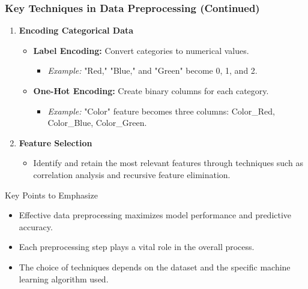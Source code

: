 \documentclass[aspectratio=169]{beamer}
\begin{document}
\begin{frame}[fragile]
    \frametitle{Key Techniques in Data Preprocessing (Continued)}
    \begin{enumerate}[resume]
        \item \textbf{Encoding Categorical Data}
            \begin{itemize}
                \item \textbf{Label Encoding:} Convert categories to numerical values.
                    \begin{itemize}
                        \item \textit{Example:} "Red," "Blue," and "Green" become 0, 1, and 2.
                    \end{itemize}
                \item \textbf{One-Hot Encoding:} Create binary columns for each category.
                    \begin{itemize}
                        \item \textit{Example:} "Color" feature becomes three columns: Color\_Red, Color\_Blue, Color\_Green.
                    \end{itemize}
            \end{itemize}
        
        \item \textbf{Feature Selection}
            \begin{itemize}
                \item Identify and retain the most relevant features through techniques such as correlation analysis and recursive feature elimination.
            \end{itemize}
    \end{enumerate}

    \begin{block}{Key Points to Emphasize}
        \begin{itemize}
            \item Effective data preprocessing maximizes model performance and predictive accuracy.
            \item Each preprocessing step plays a vital role in the overall process.
            \item The choice of techniques depends on the dataset and the specific machine learning algorithm used.
        \end{itemize}
    \end{block}
\end{frame}
\end{document}
